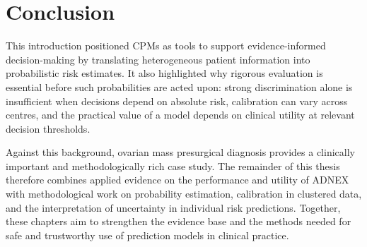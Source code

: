 \section{Conclusion}

This introduction positioned \glspl{CPM} as tools to support evidence-informed decision-making by translating heterogeneous patient information into probabilistic risk estimates. It also highlighted why rigorous evaluation is essential before such probabilities are acted upon: strong discrimination alone is insufficient when decisions depend on absolute risk, calibration can vary across centres, and the practical value of a model depends on clinical utility at relevant decision thresholds.

Against this background, ovarian mass presurgical diagnosis provides a clinically important and methodologically rich case study. The remainder of this thesis therefore combines applied evidence on the performance and utility of \gls{ADNEX} with methodological work on probability estimation, calibration in clustered data, and the interpretation of uncertainty in individual risk predictions. Together, these chapters aim to strengthen the evidence base and the methods needed for safe and trustworthy use of prediction models in clinical practice.

\let\gls\introOriggls
\let\Gls\introOrigGls
\let\glspl\introOrigglspl
\let\Glspl\introOrigGlspl
